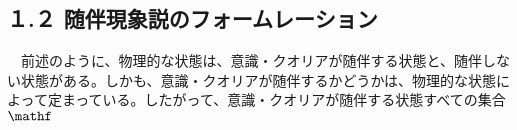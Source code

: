 \subsection{１.２ 随伴現象説のフォームレーション}
　前述のように、物理的な状態は、意識・クオリアが随伴する状態と、随伴しない状態がある。しかも、意識・クオリアが随伴するかどうかは、物理的な状態によって定まっている。したがって、意識・クオリアが随伴する状態すべての集合$\mathf$